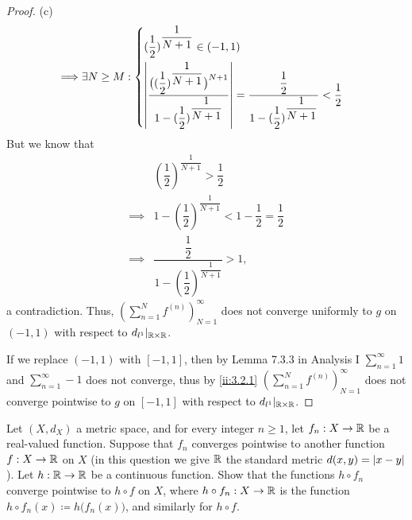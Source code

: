 \begin{proof}{(c)}
\begin{align*}
    \implies & \exists N \geq M : \begin{dcases}
                                    (\dfrac{1}{2})^{\dfrac{1}{N + 1}} \in (-1, 1) \\
                                    \left\lvert\dfrac{\big((\dfrac{1}{2})^{\dfrac{1}{N + 1}}\big)^{N + 1}}{1 - (\dfrac{1}{2})^{\dfrac{1}{N + 1}}}\right\rvert = \dfrac{\dfrac{1}{2}}{1 - (\dfrac{1}{2})^{\dfrac{1}{N + 1}}} < \dfrac{1}{2}
                                  \end{dcases}
  \end{align*}
  But we know that
  \begin{align*}
             & (\dfrac{1}{2})^{\dfrac{1}{N + 1}} > \dfrac{1}{2}                        \\
    \implies & 1 - (\dfrac{1}{2})^{\dfrac{1}{N + 1}} < 1 - \dfrac{1}{2} = \dfrac{1}{2} \\
    \implies & \dfrac{\dfrac{1}{2}}{1 - (\dfrac{1}{2})^{\dfrac{1}{N + 1}}} > 1,
  \end{align*}
  a contradiction.
  Thus, \((\sum_{n = 1}^N f^{(n)})_{N = 1}^\infty\) does not converge uniformly to \(g\) on \((-1, 1)\) with respect to \(d_{l^1}|_{\mathbb{R} \times \mathbb{R}}\).

  If we replace \((-1, 1)\) with \([-1, 1]\), then by Lemma 7.3.3 in Analysis I \(\sum_{n = 1}^\infty 1\) and \(\sum_{n = 1}^\infty -1\) does not converge, thus by \cref{ii:3.2.1} \((\sum_{n = 1}^N f^{(n)})_{N = 1}^\infty\) does not converge pointwise to \(g\) on \([-1, 1]\) with respect to \(d_{l^1}|_{\mathbb{R} \times \mathbb{R}}\).
\end{proof}

\begin{ex}\label{ii:ex:3.2.3}
  Let \((X, d_X)\) a metric space, and for every integer \(n \geq 1\), let \(f_n : X \to \mathbb{R}\) be a real-valued function.
  Suppose that \(f_n\) converges pointwise to another function \(f : X \to \mathbb{R}\) on \(X\)
  (in this question we give \(\mathbb{R}\) the standard metric \(d(x, y) = \left\lvert x - y\right\rvert\)).
  Let \(h : \mathbb{R} \to \mathbb{R}\) be a continuous function.
  Show that the functions \(h \circ f_n\) converge pointwise to \(h \circ f\) on \(X\), where \(h \circ f_n : X \to \mathbb{R}\) is the function \(h \circ f_n(x) \coloneqq h\big(f_n(x)\big)\), and similarly for \(h \circ f\).
\end{ex}

